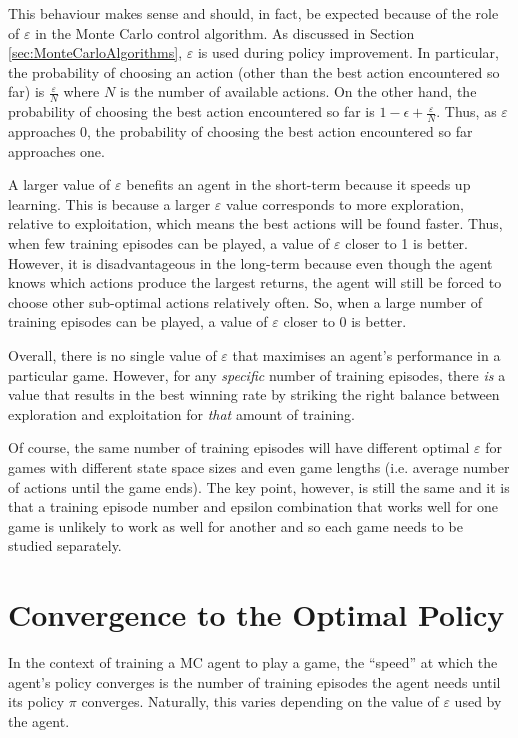 \documentclass[11pt,a4paper]{report}
\begin{document}
This behaviour makes sense and should, in fact, be expected because of the role of $\varepsilon$ in the Monte Carlo control algorithm. As discussed in Section \ref{sec:MonteCarloAlgorithms}, $\varepsilon$ is used during policy improvement. In particular, the probability of choosing an action (other than the best action encountered so far) is $\frac{\varepsilon}{N}$ where $N$ is the number of available actions. On the other hand, the probability of choosing the best action encountered so far is  $1 - \epsilon + \frac{\varepsilon}{N}$. Thus, as $\varepsilon$ approaches 0, the probability of choosing the best action encountered so far approaches one.

A larger value of $\varepsilon$ benefits an agent in the short-term because it speeds up learning. This is because a larger $\varepsilon$ value corresponds to more exploration, relative to exploitation, which means the best actions will be found faster. Thus, when few training episodes can be played, a value of $\varepsilon$ closer to 1 is better. However, it is disadvantageous in the long-term because even though the agent knows which actions produce the largest returns, the agent will still be forced to choose other sub-optimal actions relatively often. So, when a large number of training episodes can be played, a value of $\varepsilon$ closer to 0 is better.

Overall, there is no single value of $\varepsilon$ that maximises an agent's performance in a particular game. However, for any \emph{specific} number of training episodes, there \emph{is} a value that results in the best winning rate by striking the right balance between exploration and exploitation for \emph{that} amount of training.

Of course, the same number of training episodes will have different optimal $\varepsilon$ for games with different state space sizes and even game lengths (i.e. average number of actions until the game ends). The key point, however, is still the same and it is that a training episode number and epsilon combination that works well for one game is unlikely to work as well for another and so each game needs to be studied separately.


\section{Convergence to the Optimal Policy}
\label{sec:convergence-results}

In the context of training a MC agent to play a game, the ``speed'' at which the agent's policy converges is the number of training episodes the agent needs until its policy $\pi$ converges. Naturally, this varies depending on the value of $\varepsilon$ used by the agent.
\end{document}

